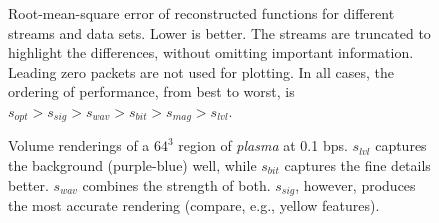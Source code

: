 \begin{figure}[h]
  \centering
		\caption{Root-mean-square error of reconstructed functions for different streams and data sets.
		Lower is better. The streams are truncated to highlight the differences, without omitting
		important information. Leading zero packets are not used for plotting. In all cases, the
		ordering of performance, from best to worst, is $s_{opt} > s_{sig} > s_{wav} > s_{bit} > s_{mag}
		> s_{lvl}$.}\label{fig:rmse-optimized}
\end{figure}

\begin{figure}[h]
	\centering
	 
	  
	 \caption{Volume renderings
	of a $64^3$ region of \emph{plasma} at 0.1 bps. $s_{lvl}$ captures the background (purple-blue)
	well, while $s_{bit}$ captures the fine details better. $s_{wav}$ combines the strength of both.
	$s_{sig}$, however, produces the most accurate rendering (compare, e.g., yellow
	features).}\label{fig:rmse-rendering}
\end{figure}
